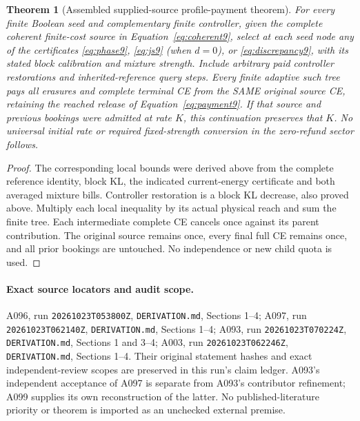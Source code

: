 \documentclass[11pt]{article}
\newtheorem{theorem}[lemma]{Theorem}
\begin{document}
\begin{theorem}[Assembled supplied-source profile-payment theorem]
\label{thm:assembledphase9}
For every finite Boolean seed and complementary finite controller,
given the complete coherent finite-cost source in
Equation~\eqref{eq:coherent9}, select at each seed node any of the
certificates \eqref{eq:phase9}, \eqref{eq:js9} (when $d=0$), or
\eqref{eq:discrepancy9}, with its stated block calibration and
mixture strength. Include arbitrary paid controller restorations
and inherited-reference query steps. Every finite adaptive such tree
pays all erasures and complete terminal CE from the SAME original
source CE, retaining the reached release of
Equation~\eqref{eq:payment9}. If that source and previous bookings
were admitted at rate $K$, this continuation preserves that $K$.
No universal initial rate or required fixed-strength conversion in
the zero-refund sector follows.
\end{theorem}
\begin{proof}
The corresponding local bounds were derived above from the complete
reference identity, block KL, the indicated current-energy certificate
and both averaged mixture bills. Controller restoration is a block
KL decrease, also proved above. Multiply each local inequality by
its actual physical reach and sum the finite tree. Each intermediate
complete CE cancels once against its parent contribution. The original
source remains once, every final full CE remains once, and all prior
bookings are untouched. No independence or new child quota is used.
\end{proof}

\paragraph{Exact source locators and audit scope.}
A096, run \texttt{20261023T053800Z}, \texttt{DERIVATION.md}, Sections 1--4;
A097, run \texttt{20261023T062140Z}, \texttt{DERIVATION.md}, Sections 1--4;
A093, run \texttt{20261023T070224Z}, \texttt{DERIVATION.md}, Sections 1 and 3--4;
A003, run \texttt{20261023T062246Z}, \texttt{DERIVATION.md}, Sections 1--4.
Their original statement hashes and exact independent-review scopes
are preserved in this run's claim ledger. A093's independent acceptance
of A097 is separate from A093's contributor refinement; A099 supplies
its own reconstruction of the latter. No published-literature priority
or theorem is imported as an unchecked external premise.
\end{document}
